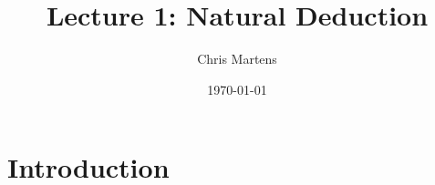 \documentclass{article}
\title{Lecture 1: Natural Deduction}
\author{Chris Martens}
\date{\today}
\begin{document}
\maketitle

\section{Introduction}
\end{document}
